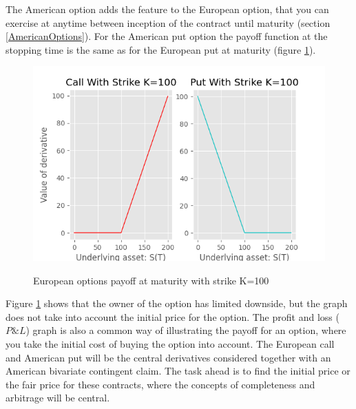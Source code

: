 The American option adds the feature to the European option, that you can exercise at anytime between inception of the contract until maturity (section \ref{AmericanOptions}). For the American put option the payoff function at the stopping time is the same as for the European put at maturity (figure \ref{fig:contractfct}). 

\begin{figure}[H]
\centering
\includegraphics{Figures/contractfct.png}\\
\decoRule
\caption[Contract Functions]{European options payoff at maturity with strike K=100}
\label{fig:contractfct}
\end{figure}

Figure \ref{fig:contractfct} shows that the owner of the option has limited downside, but the graph does not take into account the initial price for the option. The profit and loss ($P\& L$) graph is also a common way of illustrating the payoff for an option, where you take the initial cost of buying the option into account. The European call and American put will be the central derivatives considered together with an American bivariate contingent claim. The task ahead is to find the initial price or the fair price for these contracts, where the concepts of completeness and arbitrage will be central.


